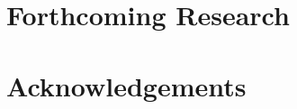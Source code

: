 \documentclass[a0, landscape]{a0poster}
\begin{document}
\begin{multicols}{4}
\color{DarkSlateGray} %


\section*{Forthcoming Research}


\nocite{*} %


\section*{Acknowledgements}

\end{multicols}
\end{document}
